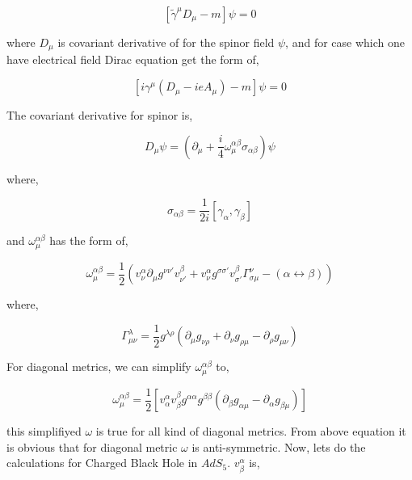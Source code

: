 \begin{equation}
   \left[\tilde{\gamma}^{\mu}D_{\mu} - m\right]\psi = 0
\end{equation}

where $D_{\mu}$ is covariant derivative of for the spinor field $\psi$, and for case which one have electrical field Dirac equation get the form of,

\begin{equation}
   \left[i\gamma^{\mu}(D_{\mu} - ieA_{\mu}) - m\right]\psi = 0
\end{equation}

The covariant derivative for spinor is,

\begin{equation}
   D_{\mu} \psi = \left(\partial_{\mu} + \frac{i}{4}\omega^{\alpha\beta}_{\mu}\sigma_{\alpha\beta}\right) \psi
\end{equation}

where,

\begin{equation}
   \sigma_{\alpha\beta} = \frac{1}{2i}[\gamma_{\alpha},\gamma_{\beta}]
\end{equation}

and $\omega^{\alpha\beta}_{\mu}$ has the form of,

\begin{equation}
   \omega^{\alpha\beta}_{\mu} = \frac{1}{2}\left(v^{\alpha}_{\nu}\partial_{\mu}g^{\nu\nu'}v^{\beta}_{\nu'} + v^{\alpha}_{\nu}g^{\sigma\sigma'}v^{\beta}_{\sigma'}\Gamma^{\nu}_{\sigma\mu} - (\alpha \leftrightarrow \beta)\right)
\end{equation}

where,

\begin{equation}
   \Gamma^{\lambda}_{\mu\nu} = \frac{1}{2}g^{\lambda\rho}(\partial_{\mu}g_{\nu\rho}+\partial_{\nu}g_{\rho\mu}-\partial_{\rho}g_{\mu\nu})
\end{equation}

For diagonal metrics, we can simplify $\omega^{\alpha\beta}_{\mu}$ to,

\begin{equation}
   \omega^{\alpha\beta}_{\mu} = \frac{1}{2}\left[v^{\alpha}_{\alpha}v^{\beta}_{\beta}g^{\alpha\alpha}g^{\beta\beta}(\partial_{\beta}g_{\alpha\mu}-\partial_{\alpha}g_{\beta\mu})\right]
\end{equation}

this simplifiyed $\omega$ is true for all kind of diagonal metrics. From above equation it is obvious that for diagonal metric $\omega$ is anti-symmetric. Now, lets do the calculations for Charged Black Hole in $AdS_5$. $v^{\alpha}_{\beta}$ is,

